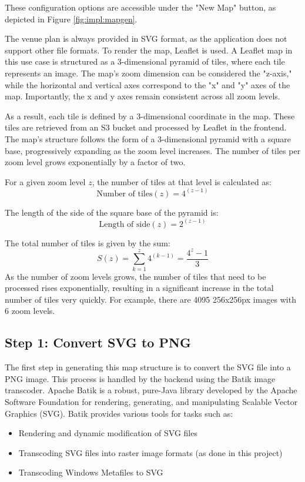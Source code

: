 These configuration options are accessible under the "New Map" button, as depicted in Figure \ref{fig:impl:mapgen}.

The venue plan is always provided in SVG format, as the application does not support other file formats. To render the map, Leaflet is used. A Leaflet map in this use case is structured as a 3-dimensional pyramid of tiles, where each tile represents an image. The map's zoom dimension can be considered the "z-axis," while the horizontal and vertical axes correspond to the "x" and "y" axes of the map. Importantly, the x and y axes remain consistent across all zoom levels.

As a result, each tile is defined by a 3-dimensional coordinate in the map. These tiles are retrieved from an S3 bucket and processed by Leaflet in the frontend. The map's structure follows the form of a 3-dimensional pyramid with a square base, progressively expanding as the zoom level increases. The number of tiles per zoom level grows exponentially by a factor of two.

For a given zoom level \( z \), the number of tiles at that level is calculated as:
\[
\text{Number of tiles}(z) = 4^{(z-1)}
\]

The length of the side of the square base of the pyramid is:
\[
\text{Length of side}(z) = 2^{(z-1)}
\]

The total number of tiles is given by the sum:
\[
S(z) = \sum_{k=1}^{z} 4^{(k-1)} = \frac{4^z - 1}{3}
\]
As the number of zoom levels grows, the number of tiles that need to be processed rises exponentially, resulting in a significant increase in the total number of tiles very quickly. For example, there are 4095 256x256px images with 6 zoom levels.

\subsection{Step 1: Convert SVG to PNG}

The first step in generating this map structure is to convert the SVG file into a PNG image. This process is handled by the backend using the Batik image transcoder. Apache Batik is a robust, pure-Java library developed by the Apache Software Foundation for rendering, generating, and manipulating Scalable Vector Graphics (SVG). Batik provides various tools for tasks such as:

\begin{itemize} \item Rendering and dynamic modification of SVG files \item Transcoding SVG files into raster image formats (as done in this project) \item Transcoding Windows Metafiles to SVG \end{itemize}

